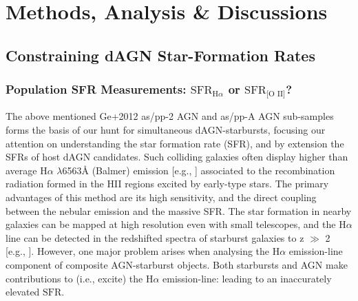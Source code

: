 \section{Methods, Analysis \& Discussions}
\subsection{Constraining dAGN Star-Formation Rates}
\subsubsection{Population SFR Measurements: $\text{SFR}_{\text{H}\alpha}$ or $\text{SFR}_{\text{[O II]}}$?}

The above mentioned Ge+2012 as/pp-2 AGN and as/pp-A AGN sub-samples forms the basis of our hunt for simultaneous dAGN-starbursts, focusing our attention on understanding the star formation rate (SFR), and by extension the SFRs of host dAGN candidates. Such colliding galaxies often display higher than average $\text{H}\alpha$ $\lambda$6563{\AA } (Balmer) emission [e.g., \cite{Kennicutt_1987}] associated to the recombination radiation formed in the HII regions excited by early-type stars. The primary advantages of this method are its high sensitivity, and the direct coupling between the nebular emission and the massive SFR. The star formation in nearby galaxies can be mapped at high resolution even with small telescopes, and the $\text{H}\alpha$ line can be detected in the redshifted spectra of starburst galaxies to z $\gg$ 2 [e.g., \cite{1997ApJ...477L..29B}]. However, one major problem arises when analysing the $\text{H}\alpha$ emission-line component of composite AGN-starburst objects. Both starbursts and AGN make contributions to (i.e., excite) the $\text{H}\alpha$ emission-line: leading to an inaccurately elevated $\text{SFR}$.

